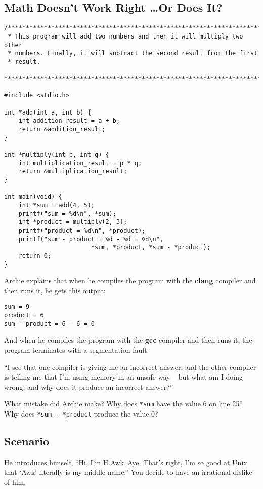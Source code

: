 \subsection{Math Doesn't Work Right \dots Or Does It?} \label{subsec:danglingPointers}

\transitionone

\begin{lstlisting}
/***********************************************************************
 * This program will add two numbers and then it will multiply two other
 * numbers. Finally, it will subtract the second result from the first
 * result.
 ***********************************************************************/

#include <stdio.h>

int *add(int a, int b) {
    int addition_result = a + b;
    return &addition_result;
}

int *multiply(int p, int q) {
    int multiplication_result = p * q;
    return &multiplication_result;
}

int main(void) {
    int *sum = add(4, 5);
    printf("sum = %d\n", *sum);
    int *product = multiply(2, 3);
    printf("product = %d\n", *product);
    printf("sum - product = %d - %d = %d\n",
                        *sum, *product, *sum - *product);
    return 0;
}
\end{lstlisting}

Archie explains that when he compiles the program with the \textbf{clang} compiler and then runs it, he gets this output:

\begin{verbatim}
sum = 9
product = 6
sum - product = 6 - 6 = 0
\end{verbatim}

And when he compiles the program with the \textbf{gcc} compiler and then runs it, the program terminates with a segmentation fault.

``I see that one compiler is giving me an incorrect answer, and the other compiler is telling me that I'm using memory in an unsafe way -- but what am I doing wrong, and why does it produce an incorrect answer?''

What mistake did Archie make?
Why does \lstinline{*sum} have the value 6 on line 25?
Why does \lstinline{*sum - *product} produce the value 0?
\begin{description}
\end{description}


\subsection{Scenario}

\transitiontwo


He introduces himself, ``Hi, I'm H.Awk~Aye.
That's right, I'm so good at Unix that `Awk' literally is my middle name.''
You decide to have an irrational dislike of him.

\transitionthree

\transitionfour

